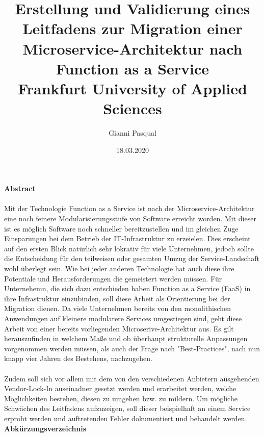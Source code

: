 \documentclass[11pt]{article}
\title{
{Erstellung und Validierung eines Leitfadens zur Migration einer Microservice-Architektur nach Function as a Service}\\
{\large Frankfurt University of Applied Sciences}\\}
\author{Gianni Pasqual}
\date{18.03.2020}
\begin{document}
\maketitle
\newpage
{\Large \textbf {Abstract}}
\\\\
Mit der Technologie Function as a Service ist nach der Microservice-Architektur eine noch feinere Modularisierungsstufe von Software erreicht worden. Mit dieser ist es möglich Software noch schneller bereitzustellen und im gleichen Zuge Einsparungen bei dem Betrieb der IT-Infrastruktur zu erzeielen. Dies erscheint auf den ersten Blick natürlich sehr lokrativ für viele Unternehmen, jedoch sollte die Entscheidung für den teilweisen oder gesamten Umzug der Service-Landschaft wohl überlegt sein. Wie bei jeder anderen Technologie hat auch diese ihre Potentiale und Herausforderungen die gemeistert werden müssen. Für Unternehemn, die sich dazu entschieden haben Function as a Service (FaaS) in ihre Infrastruktur einzubinden, soll diese Arbeit als Orientierung bei der Migration dienen. Da viele Unternehmen bereits von den monolithischen Anwendungen auf kleinere modularere Services umgestiegen sind, geht diese Arbeit von einer bereits vorliegenden Microserive-Architektur aus. Es gilt herauszufinden in welchem Maße und ob überhaupt strukturelle Anpassungen vorgenommen werden müssen, als auch der Frage nach "Best-Practices", nach nun knapp vier Jahren des Bestehens, nachzugehen.
\\\\
Zudem soll sich vor allem mit dem von den verschiedenen Anbietern ausgehenden Vendor-Lock-In auseinadner gesetzt werden und erarbeitet werden, welche Möglichkeiten bestehen, diesen zu umgehen bzw. zu mildern. Um mögliche Schwächen des Leitfadens aufzuzeigen, soll dieser beispielhaft an einem Service erprobt werden und auftretenden Fehler dokumentiert und behandelt werden.
\newpage
{\Large \textbf {Abkürzungsverzeichnis}}
\\\\\\
\end{document}
